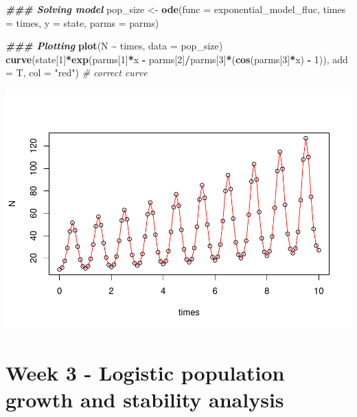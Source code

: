 \documentclass[
]{book}
\newenvironment{Shaded}{\begin{snugshade}}{\end{snugshade}}
\newcommand{\AttributeTok}[1]{\textcolor[rgb]{0.13,0.29,0.53}{#1}}
\newcommand{\CommentTok}[1]{\textcolor[rgb]{0.56,0.35,0.01}{\textit{#1}}}
\newcommand{\DecValTok}[1]{\textcolor[rgb]{0.00,0.00,0.81}{#1}}
\newcommand{\DocumentationTok}[1]{\textcolor[rgb]{0.56,0.35,0.01}{\textbf{\textit{#1}}}}
\newcommand{\FunctionTok}[1]{\textcolor[rgb]{0.13,0.29,0.53}{\textbf{#1}}}
\newcommand{\NormalTok}[1]{#1}
\newcommand{\OtherTok}[1]{\textcolor[rgb]{0.56,0.35,0.01}{#1}}
\newcommand{\SpecialCharTok}[1]{\textcolor[rgb]{0.81,0.36,0.00}{\textbf{#1}}}
\newcommand{\StringTok}[1]{\textcolor[rgb]{0.31,0.60,0.02}{#1}}
\begin{document}
\begin{Shaded}
\begin{Highlighting}[]
\DocumentationTok{\#\#\# Solving model}
\NormalTok{pop\_size }\OtherTok{\textless{}{-}} \FunctionTok{ode}\NormalTok{(}\AttributeTok{func =}\NormalTok{ exponential\_model\_fluc, }\AttributeTok{times =}\NormalTok{ times, }\AttributeTok{y =}\NormalTok{ state, }\AttributeTok{parms =}\NormalTok{ parms)}

\DocumentationTok{\#\#\# Plotting}
\FunctionTok{plot}\NormalTok{(N }\SpecialCharTok{\textasciitilde{}}\NormalTok{ times, }\AttributeTok{data =}\NormalTok{ pop\_size)}
\FunctionTok{curve}\NormalTok{(state[}\DecValTok{1}\NormalTok{]}\SpecialCharTok{*}\FunctionTok{exp}\NormalTok{(parms[}\DecValTok{1}\NormalTok{]}\SpecialCharTok{*}\NormalTok{x }\SpecialCharTok{{-}}\NormalTok{ parms[}\DecValTok{2}\NormalTok{]}\SpecialCharTok{/}\NormalTok{parms[}\DecValTok{3}\NormalTok{]}\SpecialCharTok{*}\NormalTok{(}\FunctionTok{cos}\NormalTok{(parms[}\DecValTok{3}\NormalTok{]}\SpecialCharTok{*}\NormalTok{x) }\SpecialCharTok{{-}} \DecValTok{1}\NormalTok{)), }\AttributeTok{add =}\NormalTok{ T, }\AttributeTok{col =} \StringTok{"red"}\NormalTok{) }\CommentTok{\# correct curve}
\end{Highlighting}
\end{Shaded}

\includegraphics{bookdown-demo_files/figure-latex/unnamed-chunk-12-2.pdf}

\hypertarget{week-3---logistic-population-growth-and-stability-analysis}{%
\chapter*{Week 3 - Logistic population growth and stability analysis}\label{week-3---logistic-population-growth-and-stability-analysis}}
\end{document}
